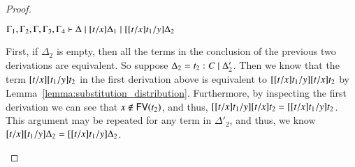 \documentclass{elsarticle}
\begin{document}
\begin{proof}
\begin{report}
\begin{itemize}
\begin{center}
\begin{math}
$${    }{ \Gamma_{{\mathrm{1}}}  \FILLsym{,}  \Gamma_{{\mathrm{2}}}  \FILLsym{,}  \Gamma  \FILLsym{,}  \Gamma_{{\mathrm{3}}}  \FILLsym{,}  \Gamma_{{\mathrm{4}}}  \vdash     \Delta  \mid  \FILLsym{[}  \FILLnt{t}  \FILLsym{/}  \FILLmv{x}  \FILLsym{]}  \Delta_{{\mathrm{1}}}    \mid  \FILLsym{[}  \FILLsym{[}  \FILLnt{t}  \FILLsym{/}  \FILLmv{x}  \FILLsym{]}  \FILLnt{t_{{\mathrm{1}}}}  \FILLsym{/}  \FILLmv{y}  \FILLsym{]}  \Delta_{{\mathrm{2}}}  }
  \end{math}
\end{center}
First, if $\Delta_{{\mathrm{2}}}$ is empty, then all the terms in the conclusion of
the previous two derivations are equivalent.  
So suppose $\Delta_{{\mathrm{2}}} =  \mathit{t_{{\mathrm{2}}}}  :  \mathit{C}  \mid  \Delta'_{{\mathrm{2}}} $.  Then we know that the term
$[  \mathit{t}  /  \mathit{x}  ]  [  \mathit{t_{{\mathrm{1}}}}  /  \mathit{y}  ]  \mathit{t_{{\mathrm{2}}}}$ in the first derivation above is equivalent to
$[  [  \mathit{t}  /  \mathit{x}  ]  \mathit{t_{{\mathrm{1}}}}  /  \mathit{y}  ]  [  \mathit{t}  /  \mathit{x}  ]  \mathit{t_{{\mathrm{2}}}}$ by
Lemma~\ref{lemma:substitution_distribution}.  Furthermore, by
inspecting the first derivation we can see that $ \mathit{x}  \not\in \mathsf{FV}(  \mathit{t_{{\mathrm{2}}}}  ) $,
and thus, $[  [  \mathit{t}  /  \mathit{x}  ]  \mathit{t_{{\mathrm{1}}}}  /  \mathit{y}  ]  [  \mathit{t}  /  \mathit{x}  ]  \mathit{t_{{\mathrm{2}}}}  =  [  [  \mathit{t}  /  \mathit{x}  ]  \mathit{t_{{\mathrm{1}}}}  /  \mathit{y}  ]  \mathit{t_{{\mathrm{2}}}}$.  This
argument may be repeated for any term in $\Delta'_{{\mathrm{2}}}$, and thus, we know
$[  \mathit{t}  /  \mathit{x}  ]  [  \mathit{t_{{\mathrm{1}}}}  /  \mathit{y}  ]  \Delta_{{\mathrm{2}}}  =  [  [  \mathit{t}  /  \mathit{x}  ]  \mathit{t_{{\mathrm{1}}}}  /  \mathit{y}  ]  \Delta_{{\mathrm{2}}}$.


\end{itemize}
\end{report}
\end{proof}
\end{document}
